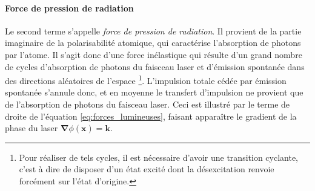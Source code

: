 \paragraph*{Force de pression de radiation}
Le second terme s'appelle \emph{force de pression de radiation}. Il provient de la partie imaginaire de la polarisabilité atomique, qui caractérise l'absorption de photons par l'atome. Il s'agit donc d'une force inélastique qui résulte d'un grand nombre de cycles d'absorption de photons du faisceau laser et d'émission spontanée dans des directions aléatoires de l'espace \footnote{Pour réaliser de tels cycles, il est nécessaire d'avoir une transition cyclante, c'est à dire de disposer d'un état excité dont la désexcitation renvoie forcément sur l'état d'origine.}. L'impulsion totale cédée par émission spontanée s'annule donc, et en moyenne le transfert d'impulsion ne provient que de l'absorption de photons du faisceau laser. Ceci est illustré par le terme de droite de l'équation \ref{eq:forces_lumineuses}, faisant apparaître le gradient de la phase du laser $\boldsymbol{\nabla} \phi (\mathbf{x})=\mathbf{k}$. 

